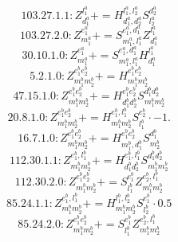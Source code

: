 \documentclass[letterpaper,10pt,fleqn,leqno,onecolumn]{article}
\begin{document}
\begin{equation} \;\;\;\;\;\;  103.27.1.1: Z^{l_{1}^{a}}_{d_{1}^{a}}+=H^{l_{1}^{a},l_{2}^{a}}_{d_{1}^{a},d_{2}^{a}}S^{d_{2}^{a}}_{l_{2}^{a}} \end{equation}
\begin{equation} \;\;\;\;\;\;  103.27.2.0: Z^{e_{1}^{a}}_{m_{1}^{a}}+=S^{e_{1}^{a},d_{1}^{a}}_{m_{1}^{a},l_{1}^{a}}Z^{l_{1}^{a}}_{d_{1}^{a}} \end{equation}
\begin{equation} \;\;\;\;\;\;  30.10.1.0: Z^{e_{1}^{a}}_{m_{1}^{a}}+=S^{e_{1}^{a},d_{1}^{a}}_{m_{1}^{a},l_{1}^{a}}H^{l_{1}^{a}}_{d_{1}^{a}} \end{equation}
\begin{equation} \;\;\;\;\;\;  5.2.1.0: Z^{e_{1}^{b}e_{2}^{b}}_{m_{1}^{b}m_{2}^{b}}+=H^{e_{1}^{b}e_{2}^{b}}_{m_{1}^{b}m_{2}^{b}} \end{equation}
\begin{equation} \;\;\;\;\;\;  47.15.1.0: Z^{e_{1}^{b}e_{2}^{b}}_{m_{1}^{b}m_{2}^{b}}+=H^{e_{1}^{b}e_{2}^{b}}_{d_{1}^{b}d_{2}^{b}}S^{d_{1}^{b}d_{2}^{b}}_{m_{1}^{b}m_{2}^{b}} \end{equation}
\begin{equation} \;\;\;\;\;\;  20.8.1.0: Z^{e_{1}^{b}e_{2}^{b}}_{m_{1}^{b}m_{2}^{b}}+=H^{e_{1}^{b},l_{1}^{b}}_{m_{1}^{b}m_{2}^{b}}S^{e_{2}^{b}}_{l_{1}^{b}}\cdot -1. \end{equation}
\begin{equation} \;\;\;\;\;\;  16.7.1.0: Z^{e_{1}^{b}e_{2}^{b}}_{m_{1}^{b}m_{2}^{b}}+=H^{e_{1}^{b}e_{2}^{b}}_{m_{1}^{b},d_{1}^{b}}S^{d_{1}^{b}}_{m_{2}^{b}} \end{equation}
\begin{equation} \;\;\;\;\;\;  112.30.1.1: Z^{e_{1}^{b},l_{1}^{b}}_{m_{1}^{b}m_{2}^{b}}+=H^{e_{1}^{b},l_{1}^{b}}_{d_{1}^{b}d_{2}^{b}}S^{d_{1}^{b}d_{2}^{b}}_{m_{1}^{b}m_{2}^{b}} \end{equation}
\begin{equation} \;\;\;\;\;\;  112.30.2.0: Z^{e_{1}^{b}e_{2}^{b}}_{m_{1}^{b}m_{2}^{b}}+=S^{e_{1}^{b}}_{l_{1}^{b}}Z^{e_{2}^{b},l_{1}^{b}}_{m_{1}^{b}m_{2}^{b}} \end{equation}
\begin{equation} \;\;\;\;\;\;  85.24.1.1: Z^{e_{1}^{b},l_{1}^{b}}_{m_{1}^{b}m_{2}^{b}}+=H^{l_{1}^{b},l_{2}^{b}}_{m_{1}^{b}m_{2}^{b}}S^{e_{1}^{b}}_{l_{2}^{b}}\cdot 0.5 \end{equation}
\begin{equation} \;\;\;\;\;\;  85.24.2.0: Z^{e_{1}^{b}e_{2}^{b}}_{m_{1}^{b}m_{2}^{b}}+=S^{e_{1}^{b}}_{l_{1}^{b}}Z^{e_{2}^{b},l_{1}^{b}}_{m_{1}^{b}m_{2}^{b}} \end{equation}
\end{document}

